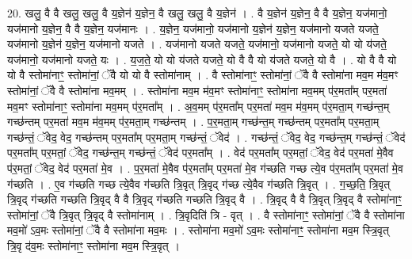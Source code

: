\documentclass[17pt]{extarticle}
\begin{document}
20. खलु॒ वै वै खलु॒ खलु॒ वै य॒ज्ञेन॑ य॒ज्ञेन॒ वै खलु॒ खलु॒ वै य॒ज्ञेन॑ । . वै य॒ज्ञेन॑ य॒ज्ञेन॒ वै वै य॒ज्ञेन॒ यज॑मानो॒ यज॑मानो य॒ज्ञेन॒ वै वै य॒ज्ञेन॒ यज॑मानः । . य॒ज्ञेन॒ यज॑मानो॒ यज॑मानो य॒ज्ञेन॑ य॒ज्ञेन॒ यज॑मानो यजते यजते॒ यज॑मानो य॒ज्ञेन॑ य॒ज्ञेन॒ यज॑मानो यजते । . यज॑मानो यजते यजते॒ यज॑मानो॒ यज॑मानो यजते॒ यो यो य॑जते॒ यज॑मानो॒ यज॑मानो यजते॒ यः । . य॒ज॒ते॒ यो यो य॑जते यजते॒ यो वै वै यो य॑जते यजते॒ यो वै । . यो वै वै यो यो वै स्तोमा॑नाꣳ॒॒ स्तोमा॑नां॒ ॅवै यो यो वै स्तोमा॑नाम् । . वै स्तोमा॑नाꣳ॒॒ स्तोमा॑नां॒ ॅवै वै स्तोमा॑ना मव॒म म॑व॒मꣳ स्तोमा॑नां॒ ॅवै वै स्तोमा॑ना मव॒मम् । . स्तोमा॑ना मव॒म म॑व॒मꣳ स्तोमा॑नाꣳ॒॒ स्तोमा॑ना मव॒मम् प॑र॒मता᳚म् पर॒मता॑ मव॒मꣳ स्तोमा॑नाꣳ॒॒ स्तोमा॑ना मव॒मम् प॑र॒मता᳚म् । . अ॒व॒मम् प॑र॒मता᳚म् पर॒मता॑ मव॒म म॑व॒मम् प॑र॒मता॒म् गच्छ॑न्त॒म् गच्छ॑न्तम् पर॒मता॑ मव॒म म॑व॒मम् प॑र॒मता॒म् गच्छ॑न्तम् । . प॒र॒मता॒म् गच्छ॑न्त॒म् गच्छ॑न्तम् पर॒मता᳚म् पर॒मता॒म् गच्छ॑न्तं॒ ॅवेद॒ वेद॒ गच्छ॑न्तम् पर॒मता᳚म् पर॒मता॒म् गच्छ॑न्तं॒ ॅवेद॑ । . गच्छ॑न्तं॒ ॅवेद॒ वेद॒ गच्छ॑न्त॒म् गच्छ॑न्तं॒ ॅवेद॑ पर॒मता᳚म् पर॒मतां॒ ॅवेद॒ गच्छ॑न्त॒म् गच्छ॑न्तं॒ ॅवेद॑ पर॒मता᳚म् । . वेद॑ पर॒मता᳚म् पर॒मतां॒ ॅवेद॒ वेद॑ पर॒मता॑ मे॒वैव प॑र॒मतां॒ ॅवेद॒ वेद॑ पर॒मता॑ मे॒व । . प॒र॒मता॑ मे॒वैव प॑र॒मता᳚म् पर॒मता॑ मे॒व ग॑च्छति गच्छ त्ये॒व प॑र॒मता᳚म् पर॒मता॑ मे॒व ग॑च्छति । . ए॒व ग॑च्छति गच्छ त्ये॒वैव ग॑च्छति त्रि॒वृत् त्रि॒वृद् ग॑च्छ त्ये॒वैव ग॑च्छति त्रि॒वृत् । . ग॒च्छ॒ति॒ त्रि॒वृत् त्रि॒वृद् ग॑च्छति गच्छति त्रि॒वृद् वै वै त्रि॒वृद् ग॑च्छति गच्छति त्रि॒वृद् वै । . त्रि॒वृद् वै वै त्रि॒वृत् त्रि॒वृद् वै स्तोमा॑नाꣳ॒॒ स्तोमा॑नां॒ ॅवै त्रि॒वृत् त्रि॒वृद् वै स्तोमा॑नाम् । . त्रि॒वृदिति॑ त्रि - वृत् । . वै स्तोमा॑नाꣳ॒॒ स्तोमा॑नां॒ ॅवै वै स्तोमा॑ना मव॒मो॑ ऽव॒मः स्तोमा॑नां॒ ॅवै वै स्तोमा॑ना मव॒मः । . स्तोमा॑ना मव॒मो॑ ऽव॒मः स्तोमा॑नाꣳ॒॒ स्तोमा॑ना मव॒म स्त्रि॒वृत् त्रि॒वृ द॑व॒मः स्तोमा॑नाꣳ॒॒ स्तोमा॑ना मव॒म स्त्रि॒वृत् । \newline
\end{document}
